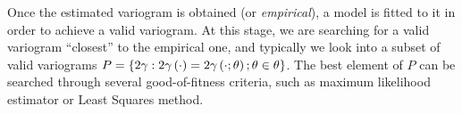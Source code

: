 


Once the estimated variogram is obtained (or \emph{empirical}), a model is fitted to it in order to achieve a valid variogram. At this stage, we are searching for a valid variogram ``closest'' to the empirical one, and typically we look into a subset of valid variograms $P=\lbrace2\gamma:2\gamma\left(\cdot\right)=2\gamma\left(\cdot;\theta\right);\theta\in\theta\rbrace$. The best element of $P$ can be searched through several good-of-fitness criteria, such as maximum likelihood estimator or Least Squares method.

